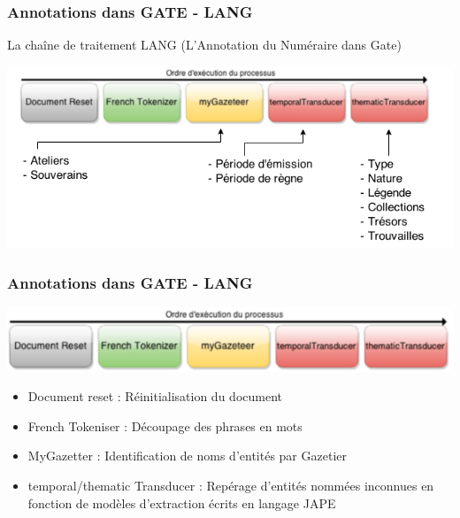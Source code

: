 \documentclass[10pt, compress]{beamer}
\begin{document}
\begin{frame}[fragile]
\frametitle{Annotations dans GATE - LANG}
La chaîne de traitement LANG (L'Annotation du Numéraire dans Gate)
\begin{center}
\includegraphics[scale=0.5]{img/chaine1.png} 
\end{center}
\end{frame}

\begin{frame}[fragile]
\frametitle{Annotations dans GATE - LANG}
\begin{center}
\includegraphics[scale=0.5]{img/chaine2.png} 
\end{center}
\begin{itemize}[<+->]
	[square]
	\item{Document reset : Réinitialisation du document}
	\item{French Tokeniser : Découpage des phrases en mots}
	\item{MyGazetter : Identification de noms d'entités par Gazetier}
	\item{temporal/thematic Transducer : Repérage d'entités nommées inconnues en fonction de modèles d'extraction écrits en langage JAPE}
\end{itemize}
\end{frame}
\end{document}
